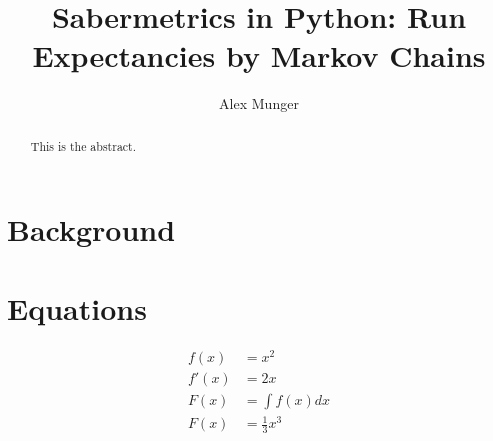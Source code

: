 \documentclass{article}
\title{Sabermetrics in Python: Run Expectancies by Markov Chains}
\author{Alex Munger}
\begin{document}
\maketitle

\begin{abstract}
	This is the abstract.
\end{abstract}

\section{Background}

\section{Equations}

\begin{align*}
	f(x) &= x^2\\
	f'(x) &= 2x\\
	F(x) &= \int f(x)dx\\
	F(x) &= \frac{1}{3}x^3
\end{align*}
\end{document}
